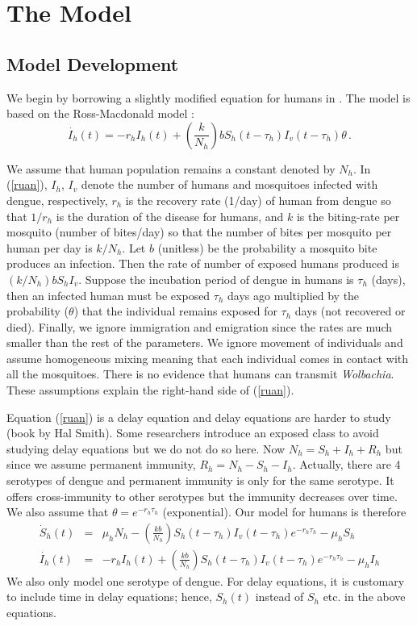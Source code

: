 \documentclass[12pt,leqno]{article}
\begin{document}
\section{The Model}
\subsection{Model Development}
We begin by borrowing a slightly modified equation for humans in \citep{Ruan2008}. The model is based on the Ross-Macdonald model
\citep{Anderson1992}:
\begin{equation}\label{ruan}
\dot{I_h}(t) = -r_hI_h(t) + \left(\frac{k}{N_h}\right)bS_h(t-\tau_h)I_v(t-\tau_h)\theta\,. %
\end{equation}

We assume that human population remains a constant denoted by $N_h$. In (\ref{ruan}), $I_h$, $I_v$ denote the number of humans and mosquitoes infected with dengue, respectively, $r_h$ is the recovery rate (1/day) of human from dengue so that $1/r_h$ is the duration of the disease for humans, and $k$ is the biting-rate per mosquito (number of bites/day) so that the number of bites per mosquito per human per day is $k/N_h$. Let $b$ (unitless) be the probability a mosquito bite produces an infection. Then the rate of number of exposed humans produced is $(k/N_h)bS_hI_v$. Suppose the incubation period of dengue in humans is $\tau_h$ (days), then an infected human must be exposed $\tau_h$ days ago multiplied by the probability ($\theta$) that the individual remains exposed for $\tau_h$ days (not recovered or died).  Finally, we ignore immigration and emigration since the rates are much smaller than the rest of the parameters. We ignore movement of individuals and assume homogeneous mixing meaning that each individual comes in contact with all the mosquitoes. There is no evidence that humans can transmit {\it Wolbachia}. These assumptions explain the right-hand side of (\ref{ruan}).\smallskip

Equation (\ref{ruan}) is a delay equation and delay equations are harder to study (book by Hal Smith). Some researchers introduce an exposed class to avoid studying delay equations but we do not do so here. Now $N_h = S_h + I_h + R_h$ but since we assume permanent immunity, $R_h = N_h - S_h - I_h$. Actually, there are 4 serotypes of dengue and permanent immunity is only for the same serotype. It offers cross-immunity to other serotypes but the immunity decreases over time. We also assume that $\theta = e^{-r_h \tau_h}$ (exponential). Our model for humans is therefore
\begin{eqnarray}
\dot{S}_h(t) &=& \mu_hN_h - \left(\frac{k b}{N_h}\right) S_h(t-\tau_h)  I_v(t-\tau_h)e^{-r_h\tau_h} - \mu_h S_h\nonumber\\
\dot{I_h}(t) &=& -r_hI_h(t) + \left(\frac{k b}{N_h}\right)S_h(t-\tau_h)I_v(t-\tau_h)e^{-r_h\tau_h} - \mu_h I_h\label{human}
\end{eqnarray}
We also only model one serotype of dengue. For delay equations, it is customary to include time in delay equations; hence, $S_h(t)$ instead of $S_h$ etc. in the above equations.\smallskip 
\end{document}

